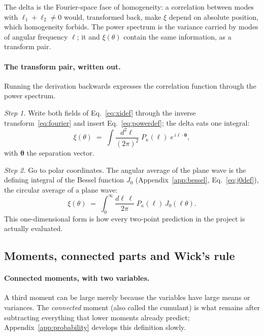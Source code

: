 \documentclass[11pt]{article}
\newcommand{\btheta}{\boldsymbol{\theta}}
\newcommand{\bell}{\boldsymbol{\ell}}
\numberwithin{equation}{section}
\begin{document}
The delta is the Fourier-space face of homogeneity: a correlation
between modes with $\bell_1 + \bell_2 \neq 0$ would, transformed
back, make $\xi$ depend on absolute position, which homogeneity
forbids.  The power spectrum is the variance carried by modes of
angular frequency $\ell$; it and $\xi(\theta)$ contain the same
information, as a transform pair.

\paragraph{The transform pair, written out.}
Running the derivation backwards expresses the correlation function
through the power spectrum.

\emph{Step 1.}  Write both fields of Eq.~\eqref{eq:xidef} through
the inverse transform~\eqref{eq:fourier} and insert
Eq.~\eqref{eq:powerdef}; the delta eats one integral:
\begin{equation}
  \xi(\theta)
  \;=\; \int \frac{d^2\ell}{(2\pi)^2}\;
  P_\kappa(\ell)\; e^{\,i\bell\cdot\btheta} ,
  \label{eq:xistep1}
\end{equation}
with $\btheta$ the separation vector.

\emph{Step 2.}  Go to polar coordinates.  The angular average of the
plane wave is the defining integral of the Bessel function $J_0$
(Appendix~\ref{app:bessel}, Eq.~\eqref{eq:j0def}), the circular
average of a plane wave:
\begin{equation}
  \xi(\theta)
  \;=\; \int_0^\infty \frac{d\ell\,\ell}{2\pi}\;
  P_\kappa(\ell)\, J_0(\ell\theta) .
  \label{eq:xifromp}
\end{equation}
This one-dimensional form is how every two-point prediction in the
project is actually evaluated.

\subsection{Moments, connected parts and Wick's rule}
\label{sec:bispectrum}

\paragraph{Connected moments, with two variables.}
A third moment can be large merely because the variables have large
means or variances.  The \emph{connected} moment (also called the
cumulant) is what remains after subtracting everything that lower
moments already predict; Appendix~\ref{app:probability} develops
this definition slowly.
\end{document}
